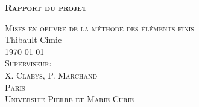 \begin{titlepage}
	\begin{center}
		\vspace*{2.5cm}
		\textbf{
		\huge{
		\textsc{Rapport du projet}\\}}

		\vspace{5cm}

		\LARGE{
		\textsc{Mises en oeuvre de la m\'ethode des \'el\'ements finis}\\[0.5\baselineskip]
		Thibault Cimic\\

		\vspace{5cm}
		\textsc{\today}\\ 

		\vspace{1cm}
		\textsc{Superviseur:\\
		X. Claeys, P. Marchand}\\

		\vspace{1cm}
		\textsc{Paris\\
		Universite Pierre et Marie Curie}\\}

		\end{center}

\end{titlepage}